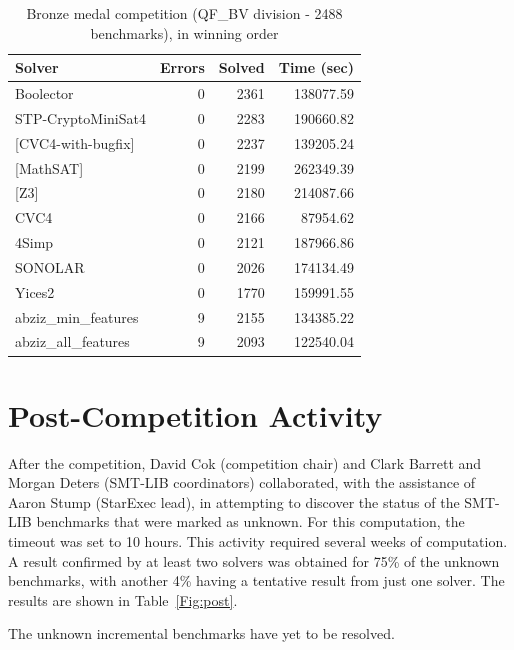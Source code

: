 \documentclass[twoside,11pt]{article}
\begin{document}
\begin{table}
\centering
\begin{tabular}{|l|rrr|}
\hline
 Solver & Errors & Solved & Time (sec)\\
\hline
Boolector &	0  &		2361  &		138077.59 \\
STP-CryptoMiniSat4 & 0  &		2283  &		190660.82 	\\
{[}CVC4-with-bugfix] &	0  &		2237 	 &		139205.24 \\
{[}MathSAT]  &	0  &		2199 	 &		262349.39 \\
{[}Z3]  & 	0  &		2180 	 &		214087.66 	\\
CVC4  &	0  &		2166 	 &		87954.62 	\\
4Simp &	0 &	2121 	 &		187966.86 \\
SONOLAR &	0  &		2026  &	 	174134.49 \\
Yices2 &	0  &		1770  &	 	159991.55 \\
abziz\_min\_features &	9  &		2155 	 &	 	134385.22 \\
abziz\_all\_features &	9  &		2093 	 &	 	122540.04 \\
\hline
\end{tabular}
\vspace{.2in}
\caption{Bronze medal competition (QF\_BV division - 2488 benchmarks), in winning order}
\label{Table:bronze}
\end{table}

\section{Post-Competition Activity}
\label{sec:post}

After the competition, David Cok (competition chair) and Clark Barrett and Morgan Deters (SMT-LIB coordinators) collaborated, with the assistance of Aaron Stump (StarExec lead), in attempting to discover the status of the SMT-LIB benchmarks that were marked as unknown. For this computation, the timeout was set to 10 hours. This activity required several weeks of computation. A result confirmed by at least two solvers was obtained for 75\% of the unknown benchmarks, with another 4\% having a tentative result from just one solver.
The results are shown in Table~\ref{Fig:post}. 

The unknown incremental benchmarks have yet to be resolved.
\end{document}
